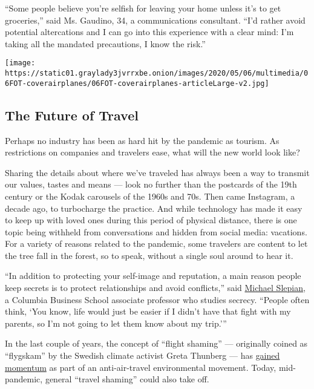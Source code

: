 ``Some people believe you're selfish for leaving your home unless it's
to get groceries,'' said Ms. Gaudino, 34, a communications consultant.
``I'd rather avoid potential altercations and I can go into this
experience with a clear mind: I'm taking all the mandated precautions, I
know the risk.''

\href{https://www.nytimes3xbfgragh.onion/interactive/2020/05/06/travel/coronavirus-travel-questions.html}{}

\texttt{[image: https://static01.graylady3jvrrxbe.onion/images/2020/05/06/multimedia/06FOT-coverairplanes/06FOT-coverairplanes-articleLarge-v2.jpg]}

\hypertarget{the-future-of-travel}{%
\subsection{The Future of Travel}\label{the-future-of-travel}}

Perhaps no industry has been as hard hit by the pandemic as tourism. As
restrictions on companies and travelers ease, what will the new world
look like?

Sharing the details about where we've traveled has always been a way to
transmit our values, tastes and means --- look no further than the
postcards of the 19th century or the Kodak carousels of the 1960s and
70s. Then came Instagram, a decade ago, to turbocharge the practice. And
while technology has made it easy to keep up with loved ones during this
period of physical distance, there is one topic being withheld from
conversations and hidden from social media: vacations. For a variety of
reasons related to the pandemic, some travelers are content to let the
tree fall in the forest, so to speak, without a single soul around to
hear it.

``In addition to protecting your self-image and reputation, a main
reason people keep secrets is to protect relationships and avoid
conflicts,'' said
\href{http://www.columbia.edu/~ms4992/index.html}{Michael Slepian}, a
Columbia Business School associate professor who studies secrecy.
``People often think, `You know, life would just be easier if I didn't
have that fight with my parents, so I'm not going to let them know about
my trip.'''

In the last couple of years, the concept of ``flight shaming'' ---
originally coined as ``flygskam'' by the Swedish climate activist Greta
Thunberg --- has
\href{https://www.nytimes3xbfgragh.onion/2019/12/18/travel/Sweden-flight-shaming.html}{gained
momentum} as part of an anti-air-travel environmental movement. Today,
mid-pandemic, general ``travel shaming'' could also take off.

